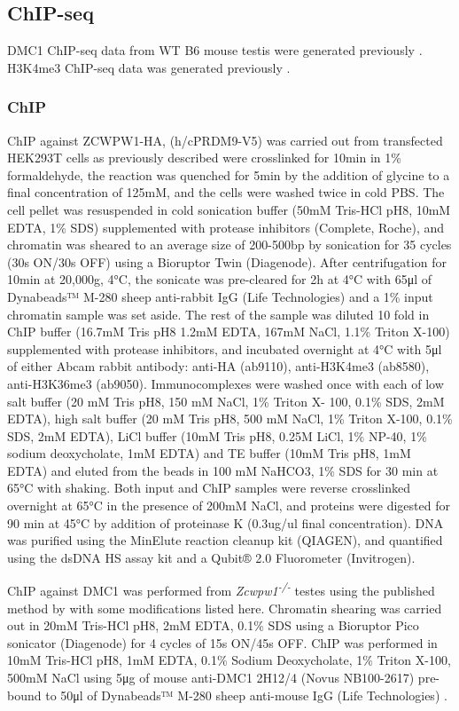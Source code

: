 \subsection{ChIP-seq}
\label{sec:chip}
DMC1 ChIP-seq data from WT B6 mouse testis were generated previously \parencite{Brick2012Genetic}. H3K4me3 ChIP-seq data was generated previously \parencite{Davies2016Reengineering}.

\subsubsection{ChIP}
ChIP against ZCWPW1-HA, (h/cPRDM9-V5) was carried out from transfected HEK293T cells as previously described \parencite{Davies2016Reengineering, Altemose2017map} were crosslinked for 10min in 1\% formaldehyde, the reaction was quenched for 5min by the addition of glycine to a final concentration of 125mM, and the cells were washed twice in cold PBS. The cell pellet was resuspended in cold sonication buffer (50mM Tris-HCl pH8, 10mM EDTA, 1\% SDS) supplemented with protease inhibitors (Complete, Roche), and chromatin was sheared to an average size of 200-500bp by sonication for 35 cycles (30s ON/30s OFF) using a Bioruptor Twin (Diagenode). After centrifugation for 10min at 20,000g, 4°C, the sonicate was pre-cleared for 2h at 4°C with 65μl of Dynabeads™ M-280 sheep anti-rabbit IgG (Life Technologies) and a 1\% input chromatin sample was set aside. The rest of the sample was diluted 10 fold in ChIP buffer (16.7mM Tris pH8 1.2mM EDTA, 167mM NaCl, 1.1\% Triton X-100) supplemented with protease inhibitors, and incubated overnight at 4°C with 5μl of either Abcam rabbit antibody: anti-HA (ab9110), anti-H3K4me3 (ab8580), anti-H3K36me3 (ab9050). Immunocomplexes were washed once with each of low salt buffer (20 mM Tris pH8, 150 mM NaCl, 1\% Triton X- 100, 0.1\% SDS, 2mM EDTA), high salt buffer (20 mM Tris pH8, 500 mM NaCl, 1\% Triton X-100, 0.1\% SDS, 2mM EDTA), LiCl buffer (10mM Tris pH8, 0.25M LiCl, 1\% NP-40, 1\% sodium deoxycholate, 1mM EDTA) and TE buffer (10mM Tris pH8, 1mM EDTA) and eluted from the beads in 100 mM NaHCO3, 1\% SDS for 30 min at 65°C with shaking. Both input and ChIP samples were reverse crosslinked overnight at 65°C in the presence of 200mM NaCl, and proteins were digested for 90 min at 45°C by addition of proteinase K (0.3ug/ul final concentration). DNA was purified using the MinElute reaction cleanup kit (QIAGEN), and quantified using the dsDNA HS assay kit and a Qubit® 2.0 Fluorometer (Invitrogen).

ChIP against DMC1 was performed from \textit{Zcwpw1\textsuperscript{-/-}} testes using the published method by \parencite{Khil2012Sensitive} with some modifications listed here. Chromatin shearing was carried out in 20mM Tris-HCl pH8, 2mM EDTA, 0.1\% SDS using a Bioruptor Pico sonicator (Diagenode) for 4 cycles of 15s ON/45s OFF. ChIP was performed in 10mM Tris-HCl pH8, 1mM EDTA, 0.1\% Sodium Deoxycholate, 1\% Triton X-100, 500mM NaCl using 5μg of mouse anti-DMC1 2H12/4 (Novus NB100-2617) pre-bound to 50μl of Dynabeads™ M-280 sheep anti-mouse IgG (Life Technologies) .

